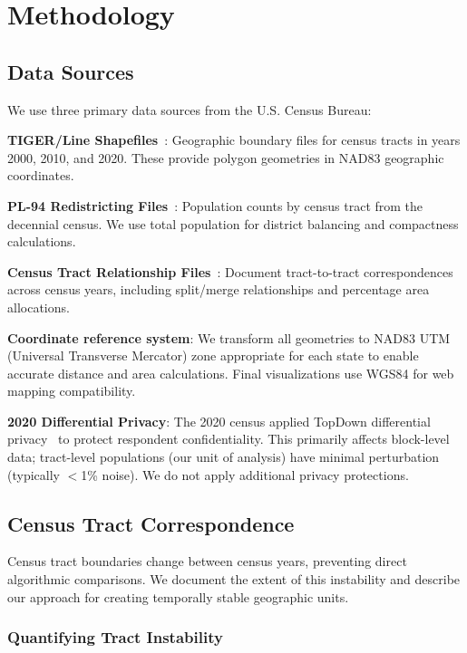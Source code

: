 \section{Methodology}
\label{sec:methodology}

\subsection{Data Sources}

We use three primary data sources from the U.S. Census Bureau:

\textbf{TIGER/Line Shapefiles}~\cite{census2020tiger}: Geographic boundary files for census tracts in years 2000, 2010, and 2020. These provide polygon geometries in NAD83 geographic coordinates.

\textbf{PL-94 Redistricting Files}~\cite{census2020pl94}: Population counts by census tract from the decennial census. We use total population for district balancing and compactness calculations.

\textbf{Census Tract Relationship Files}~\cite{census2020relationships}: Document tract-to-tract correspondences across census years, including split/merge relationships and percentage area allocations.

\textbf{Coordinate reference system}: We transform all geometries to NAD83 UTM (Universal Transverse Mercator) zone appropriate for each state to enable accurate distance and area calculations. Final visualizations use WGS84 for web mapping compatibility.

\textbf{2020 Differential Privacy}: The 2020 census applied TopDown differential privacy~\cite{abowd2022} to protect respondent confidentiality. This primarily affects block-level data; tract-level populations (our unit of analysis) have minimal perturbation (typically $<$1\% noise). We do not apply additional privacy protections.

\subsection{Census Tract Correspondence}
\label{sec:tract-correspondence}

Census tract boundaries change between census years, preventing direct algorithmic comparisons. We document the extent of this instability and describe our approach for creating temporally stable geographic units.

\subsubsection{Quantifying Tract Instability}

